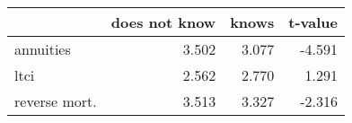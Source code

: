 \begin{tabular}{lrrr}
\toprule
{} &  does not know &  knows &  t-value \\
\midrule
annuities     &          3.502 &  3.077 &   -4.591 \\
ltci          &          2.562 &  2.770 &    1.291 \\
reverse mort. &          3.513 &  3.327 &   -2.316 \\
\bottomrule
\end{tabular}
